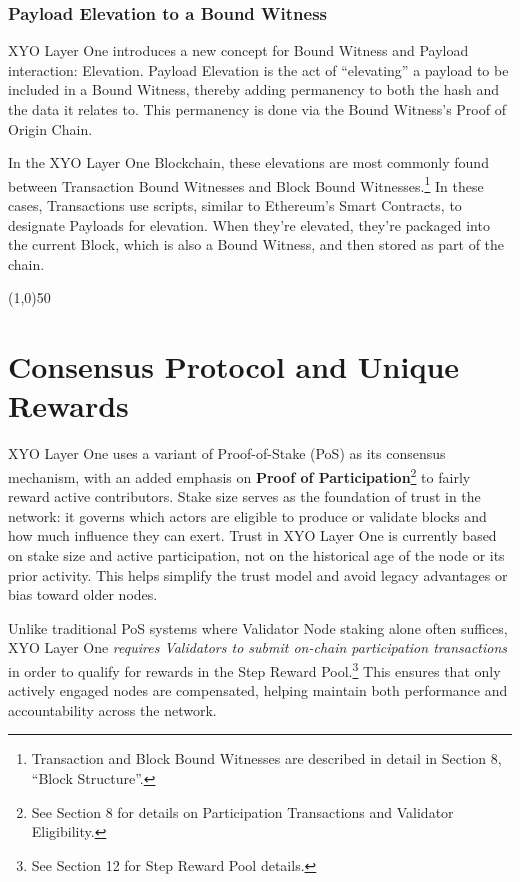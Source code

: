 \documentclass{article}
\begin{document}
\subsubsection{Payload Elevation to a Bound Witness}
XYO Layer One introduces a new concept for Bound Witness and Payload interaction: Elevation. Payload Elevation is the act of “elevating” a payload to be included in a Bound Witness, thereby adding permanency to both the hash and the data it relates to. This permanency is done via the Bound Witness's Proof of Origin Chain.

In the XYO Layer One Blockchain, these elevations are most commonly found between Transaction Bound Witnesses and Block Bound Witnesses.\footnote{Transaction and Block Bound Witnesses are described in detail in Section 8, “Block Structure”.} In these cases, Transactions use scripts, similar to Ethereum's Smart Contracts, to designate Payloads for elevation. When they're elevated, they're packaged into the current Block, which is also a Bound Witness, and then stored as part of the chain.

\begin{center}
    \line(1,0){50}
\end{center}

\section{Consensus Protocol and Unique Rewards}
XYO Layer One uses a variant of Proof-of-Stake (PoS) as its consensus mechanism, with an added emphasis on \textbf{Proof of Participation}\footnote{See Section 8 for details on Participation Transactions and Validator Eligibility.} to fairly reward active contributors. Stake size serves as the foundation of trust in the network: it governs which actors are eligible to produce or validate blocks and how much influence they can exert. Trust in XYO Layer One is currently based on stake size and active participation, not on the historical age of the node or its prior activity. This helps simplify the trust model and avoid legacy advantages or bias toward older nodes.

Unlike traditional PoS systems where Validator Node staking alone often suffices, XYO Layer One \textit{requires Validators to submit on-chain participation transactions} in order to qualify for rewards in the Step Reward Pool.\footnote{See Section 12 for Step Reward Pool details.} This ensures that only actively engaged nodes are compensated, helping maintain both performance and accountability across the network.
\end{document}
